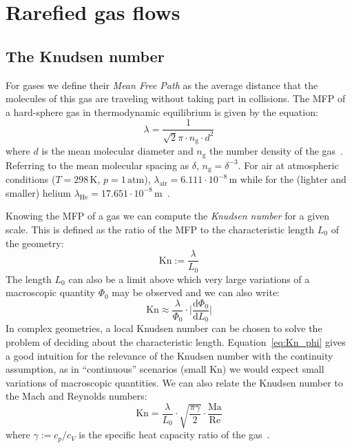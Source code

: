 \section{Rarefied gas flows}

\subsection{The Knudsen number}
For gases we define their \textit{Mean Free Path} as the average distance that 
the molecules of this gas are traveling without taking part in collisions.
The MFP of a hard-sphere gas in thermodynamic equilibrium is given by the equation:
\begin{equation}
 \lambda = \frac{1}{\sqrt{2} \pi \cdot n_\mathrm{g} \cdot d^2}
 \label{eq:MFP}
\end{equation}
where $d$ is the mean molecular diameter and $n_\mathrm{g}$ the number density of the gas~\cite{Zhang2012}.
Referring to the mean molecular spacing as $\delta$, $n_\mathrm{g}=\delta^{-3}$.
For air at atmospheric conditions ($T=298\,\mathrm{K}$, $p=1\,\mathrm{atm}$),
$\lambda_{\mathrm{air}} = 6.111\cdot10^{-8}\,\mathrm{m}$
while for the (lighter and smaller) helium 
$\lambda_{\mathrm{He}} = 17.651\cdot10^{-8}\,\mathrm{m}$~\cite{Karniadakis_Microflows}.

Knowing the MFP of a gas we can compute the \textit{Knudsen number} for a given scale.
This is defined as the ratio of the MFP to the characteristic length $L_0$ of the geometry:
\begin{equation}
 \mathrm{Kn} := \frac{\lambda}{L_0}
 \label{eq:Kn_def}
\end{equation}
The length $L_0$ can also be a limit above which very large variations of a macroscopic
quantity $\Phi_0$ may be observed and we can also write:
\begin{equation}
 \mathrm{Kn} \approx \frac{\lambda}{\Phi_0} \cdot \Big|\frac{\mathrm{d}\Phi_0}{\mathrm{d}L_0}\Big|
 \label{eq:Kn_phi}
\end{equation}
In complex geometries, a local Knudsen number can be chosen to solve the problem
of deciding about the characteristic length.
Equation~\ref{eq:Kn_phi} gives a good intuition for the relevance of the Knudsen number with
the continuity assumption, as in ``continuous'' scenarios (small $\mathrm{Kn}$) we would expect small
variations of macroscopic quantities. We can also relate the
Knudsen number to the Mach and Reynolds numbers:
\begin{equation}
 \mathrm{Kn} = \frac{\lambda}{L_0} \cdot \sqrt{\frac{\pi \gamma}{2}} \cdot \frac{\mathrm{Ma}}{\mathrm{Re}}
 \label{eq:Kn_Ma}
\end{equation}
where $\gamma := c_p / c_V$ is the specific heat capacity ratio of the gas~\cite{Zhang2012}.



